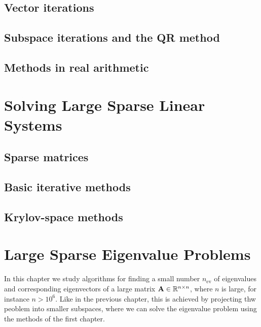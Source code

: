 \section{Vector iterations}


\section{Subspace iterations and the QR method}


\section{Methods in real arithmetic}


%

\chapter{Solving Large Sparse Linear Systems}

\section{Sparse matrices}



\section{Basic iterative methods}


\section{Krylov-space methods}


\chapter{Large Sparse Eigenvalue Problems}

\begin{intro}
  In this chapter we study algorithms for finding a small number
  $n_{\text{ev}}$ of eigenvalues and corresponding eigenvectors of a
  large matrix $\mathbf A\in\mathbb R^{n\times n}$, where $n$ is large, for instance
  $n>10^6$. Like in the previous chapter, this is achieved by
  projecting thw peoblem into smaller subspaces, where we can solve
  the eigenvalue problem using the methods of the first chapter.
\end{intro}

